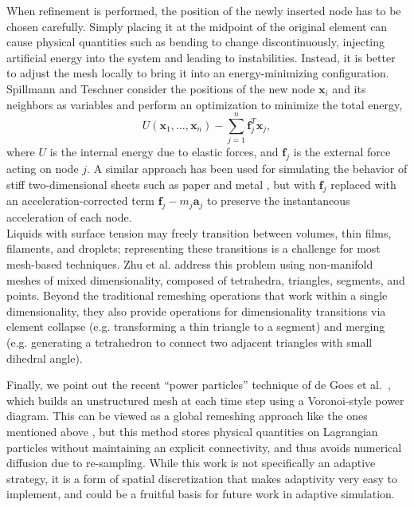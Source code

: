 When refinement is performed, the position of the newly inserted node has to be chosen carefully.
Simply placing it at the midpoint of the original element can cause physical quantities such as bending to change discontinuously, injecting artificial energy into the system and leading to instabilities.
Instead, it is better to adjust the mesh locally to bring it into an energy-minimizing configuration.
Spillmann and Teschner \cite{Spillmann2008} consider the positions of the new node $\mathbf x_i$ and its neighbors as variables and perform an optimization to minimize the total energy,
\begin{equation}
	U(\mathbf x_1,\ldots,\mathbf x_n) - \sum_{j=1}^n\mathbf f_j^T\mathbf x_j,
\end{equation}
where $U$ is the internal energy due to elastic forces, and $\mathbf f_j$ is the external force acting on node $j$.
A similar approach has been used for simulating the behavior of stiff two-dimensional sheets such as paper and metal \cite{Narain2013,Pfaff2014}, but with $\mathbf f_j$ replaced with an acceleration-corrected term $\mathbf f_j - m_j\mathbf a_j$ to preserve the instantaneous acceleration of each node.
\\
Liquids with surface tension may freely transition between volumes, thin films, filaments, and droplets; representing these transitions is a challenge for most mesh-based techniques.
Zhu et al. \cite{Zhu2014} address this problem using non-manifold meshes of mixed dimensionality, composed of tetrahedra, triangles, segments, and points.
Beyond the traditional remeshing operations that work within a single dimensionality, they also provide operations for dimensionality transitions via element collapse (e.g. transforming a thin triangle to a segment) and merging (e.g. generating a tetrahedron to connect two adjacent triangles with small dihedral angle).

Finally, we point out the recent ``power particles'' technique of de Goes et al.~\cite{deGoes2015}, which builds an unstructured mesh at each time step using a Voronoi-style power diagram.
This can be viewed as a global remeshing approach like the ones mentioned above \cite{Klingner2006,Bargteil2007}, but this method stores physical quantities on Lagrangian particles without maintaining an explicit connectivity, and thus avoids numerical diffusion due to re-sampling.
While this work is not specifically an adaptive strategy, it is a form of spatial discretization that makes adaptivity very easy to implement, and could be a fruitful basis for future work in adaptive simulation.

